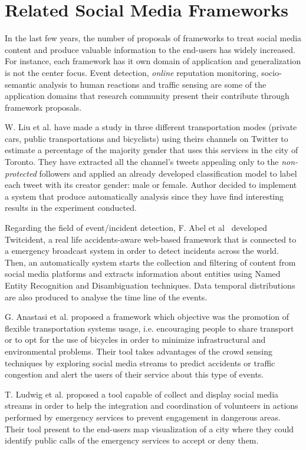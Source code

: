 \section{Related Social Media Frameworks}

In the last few years, the number of proposals of frameworks to treat social media content and produce valuable information to the end-users has widely increased. For instance, each framework has it own domain of application and generalization is not the center focus. Event detection, \textit{online} reputation monitoring, socio-semantic analysis to human reactions and traffic sensing are some of the application domains that research community present their contribute through framework proposals.

W. Liu et al. \cite{kn:Liu2012} have made a study in three different transportation modes (private cars, public transportations and bicyclists) using theirs channels on Twitter to estimate a percentage of the majority gender that uses this services in the city of Toronto. They have extracted all the channel's tweets appealing only to the \textit{non-protected} followers and applied an already developed classification model to label each tweet with its creator gender: male or female. Author decided to implement a system that produce automatically analysis since they have find interesting results in the experiment conducted.

Regarding the field of event/incident detection, F. Abel et al~\cite{kn:Abel2012} developed Twitcident, a real life accidents-aware web-based framework that is connected to a emergency broadcast system in order to detect incidents across the world. Then, an automatically system starts the collection and filtering of content from social media platforms and extracts information about entities using Named Entity Recognition and Disambiguation techniques. Data temporal distributions are also produced to analyse the time line of the events.

G. Anastasi et al. \cite{kn:Anastasi2013} proposed a framework which objective was the promotion of flexible transportation systems usage, i.e. encouraging people to share transport or to opt for the use of bicycles in order to minimize infrastructural and environmental problems. Their tool takes advantages of the crowd sensing techniques by exploring social media streams to predict accidents or traffic congestion and alert the users of their service about this type of events.

T. Ludwig et al. \cite{kn:Ludwig2015} proposed a tool capable of collect and display social media streams in order to help the integration and coordination of volunteers in actions performed by emergency services to prevent engagement in dangerous areas. Their tool present to the end-users map visualization of a city where they could identify public calls of the emergency services to accept or deny them.

